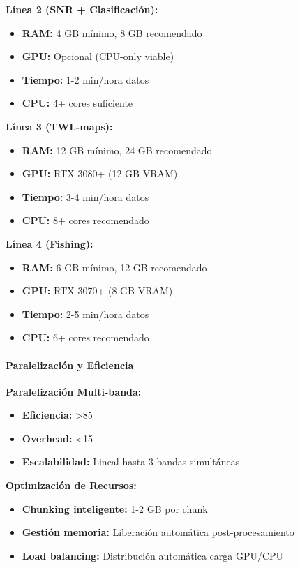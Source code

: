 \textbf{Línea 2 (SNR + Clasificación):}
\begin{itemize}
\item \textbf{RAM:} 4 GB mínimo, 8 GB recomendado
\item \textbf{GPU:} Opcional (CPU-only viable)
\item \textbf{Tiempo:} 1-2 min/hora datos
\item \textbf{CPU:} 4+ cores suficiente
\end{itemize}

\textbf{Línea 3 (TWL-maps):}
\begin{itemize}
\item \textbf{RAM:} 12 GB mínimo, 24 GB recomendado
\item \textbf{GPU:} RTX 3080+ (12 GB VRAM)
\item \textbf{Tiempo:} 3-4 min/hora datos
\item \textbf{CPU:} 8+ cores recomendado
\end{itemize}

\textbf{Línea 4 (Fishing):}
\begin{itemize}
\item \textbf{RAM:} 6 GB mínimo, 12 GB recomendado
\item \textbf{GPU:} RTX 3070+ (8 GB VRAM)
\item \textbf{Tiempo:} 2-5 min/hora datos
\item \textbf{CPU:} 6+ cores recomendado
\end{itemize}

\paragraph{Paralelización y Eficiencia}

\textbf{Paralelización Multi-banda:}
\begin{itemize}
\item \textbf{Eficiencia:} >85%
\item \textbf{Overhead:} <15%
\item \textbf{Escalabilidad:} Lineal hasta 3 bandas simultáneas
\end{itemize}

\textbf{Optimización de Recursos:}
\begin{itemize}
\item \textbf{Chunking inteligente:} 1-2 GB por chunk
\item \textbf{Gestión memoria:} Liberación automática post-procesamiento
\item \textbf{Load balancing:} Distribución automática carga GPU/CPU
\end{itemize}

